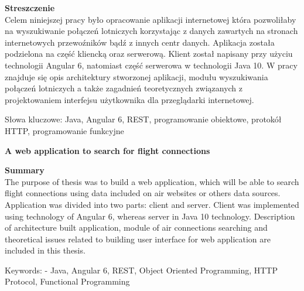 \documentclass[12pt, twoside]{report}
\newcommand\tab[1][0.5cm]{\hspace*{#1}}
\newcommand\blankpage{%
	\null
    \thispagestyle{empty}%
    \newpage}
\begin{document}
\begin{flushleft}
	{\fontsize{14pt}{12pt}\selectfont
		\textbf{Streszczenie}}\\
	\vspace{1cm}
\tab Celem niniejszej pracy było opracowanie aplikacji internetowej która pozwoliłaby na wyszukiwanie połączeń lotniczych korzystając z danych zawartych na stronach internetowych przewoźników bądź z innych centr danych. Aplikacja została podzielona na część kliencką oraz serwerową. Klient został napisany przy użyciu technologii Angular 6, natomiast część serwerowa w technologii Java 10. W pracy znajduje się opis architektury stworzonej aplikacji, modułu wyszukiwania połączeń lotniczych a także zagadnień teoretycznych związanych z projektowaniem interfejsu użytkownika dla przeglądarki internetowej.
\end{flushleft}
\vspace{0.5cm}
Słowa kluczowe: Java, Angular 6, REST, programowanie obiektowe, protokół HTTP, programowanie funkcyjne

\vspace{1.5cm}

\begin{center}
	{\fontsize{14pt}{12pt}\selectfont
		\textbf{A web application to search for flight connections}}
\end{center}

\begin{flushleft}
	{\fontsize{14pt}{12pt}\selectfont
		\textbf{Summary}}\\
	\vspace{1cm}
\tab The purpose of thesis was to build a web application, which will be able to search flight connections using data included on air websites or others data sources. Application was divided into two parts: client and server. Client was implemented using technology of Angular 6, whereas server in Java 10 technology. Description of architecture built application, module of air connections searching and theoretical issues related to building user interface for web application are included in this thesis. 
\end{flushleft}
\vspace{0.5cm}
Keywords: - Java, Angular 6, REST, Object Oriented Programming, HTTP Protocol, Functional Programming
\afterpage{\blankpage}

\renewcommand{\contentsname}{Spis treści}
\newpage
{}
\setcounter{page}{9}
\tableofcontents
\newpage
\end{document}
